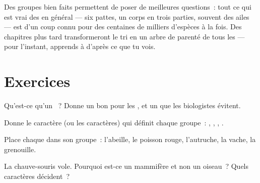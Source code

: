 \begin{remark}\label{rem:g3:sorting-living-things:science}
Des groupes bien faits permettent de poser de meilleures questions~:
tout ce qui est vrai des  en général --- six pattes, un corps
en trois parties, souvent des ailes --- est d'un coup connu pour des
centaines de milliers d'espèces à la fois. Des chapitres plus tard
transformeront le tri en un arbre de parenté de tous les  --- pour l'instant, apprends à  d'après ce que tu vois.
\end{remark}

\section{Exercices}

\begin{exercise}[$\star$]\label{exo:g3:sorting-living-things:1}
Qu'est-ce qu'un ~? Donne un bon  pour  les
, et un que les biologistes évitent.
\end{exercise}

\begin{exercise}[$\star$]\label{exo:g3:sorting-living-things:2}
Donne le caractère (ou les caractères) qui définit chaque groupe~:
, , , .
\end{exercise}

\begin{exercise}[$\star$]\label{exo:g3:sorting-living-things:3}
Place chaque  dans son groupe~: l'abeille, le poisson rouge,
l'autruche, la vache, la grenouille.
\end{exercise}

\begin{exercise}[$\star$]\label{exo:g3:sorting-living-things:4}
La chauve-souris vole. Pourquoi est-ce un mammifère et non un
oiseau~? Quels caractères décident~?
\end{exercise}

